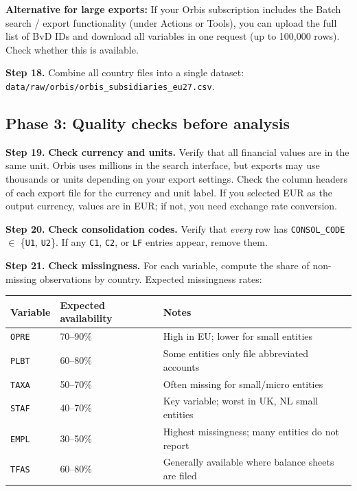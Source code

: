 \documentclass[11pt,a4paper]{article}
\newcommand{\field}[1]{\texttt{#1}}
\newcommand{\menu}[1]{\textsf{#1}}
\newcommand{\step}[1]{\noindent\textbf{Step #1.}\quad}
\begin{document}
\textbf{Alternative for large exports:} If your Orbis subscription includes the \menu{Batch search / export} functionality (under \menu{Actions} or \menu{Tools}), you can upload the full list of BvD IDs and download all variables in one request (up to 100,000 rows). Check whether this is available.

\step{18} Combine all country files into a single dataset: \texttt{data/raw/orbis/orbis\_subsidiaries\_eu27.csv}.

\subsection{Phase 3: Quality checks before analysis}\label{sec:phase3}

\step{19} \textbf{Check currency and units.} Verify that all financial values are in the same unit. Orbis uses millions in the search interface, but exports may use thousands or units depending on your export settings. Check the column headers of each export file for the currency and unit label. If you selected EUR as the output currency, values are in EUR; if not, you need exchange rate conversion.

\step{20} \textbf{Check consolidation codes.} Verify that \emph{every} row has \field{CONSOL\_CODE} $\in$ \{\field{U1}, \field{U2}\}. If any \field{C1}, \field{C2}, or \field{LF} entries appear, remove them.

\step{21} \textbf{Check missingness.} For each variable, compute the share of non-missing observations by country. Expected missingness rates:

\begin{center}
\begin{tabular}{@{}lll@{}}
\toprule
\textbf{Variable} & \textbf{Expected availability} & \textbf{Notes} \\
\midrule
\field{OPRE} & 70--90\% & High in EU; lower for small entities \\
\field{PLBT} & 60--80\% & Some entities only file abbreviated accounts \\
\field{TAXA} & 50--70\% & Often missing for small/micro entities \\
\field{STAF} & 40--70\% & Key variable; worst in UK, NL small entities \\
\field{EMPL} & 30--50\% & Highest missingness; many entities do not report \\
\field{TFAS} & 60--80\% & Generally available where balance sheets are filed \\
\bottomrule
\end{tabular}
\end{center}
\end{document}
